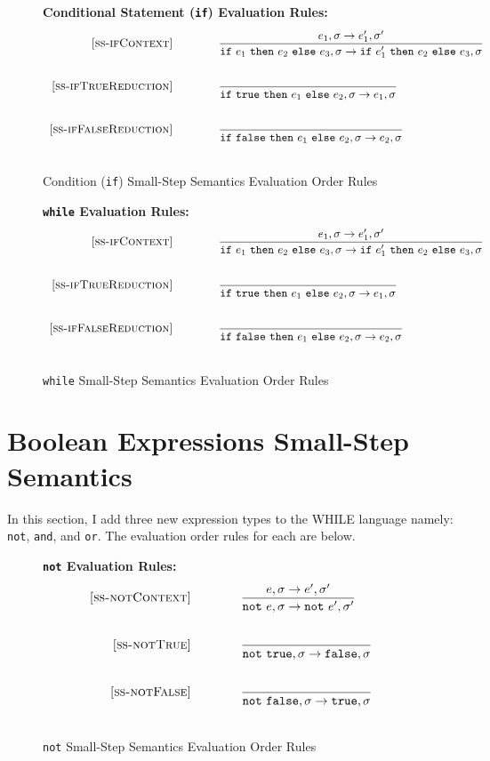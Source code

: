 \documentclass{article}
\begin{document}
\begin{figure}[H]\label{fig:condRules}
\caption{Condition ({\tt if}) Small-Step Semantics Evaluation Order Rules}
{\bf Conditional Statement ({\tt if}) Evaluation Rules:} \\
\[
\begin{array}{r@{\qquad\qquad}l}
\ssrule{ss-ifContext}{
  \sstep{e_1}{\sigma}{e_1'}{\sigma'}
}{
  \sstep{\ife{e_1}{e_2}{e_3}}{\sigma}{\ife{e_1'}{e_2}{e_3}}{\sigma}
}
\ssrule{ss-ifTrueReduction}{
}{
  \sstep{\ife{\true}{e_1}{e_2}}{\sigma}{e_1}{\sigma}
}
\ssrule{ss-ifFalseReduction}{
}{
  \sstep{\ife{\false}{e_1}{e_2}}{\sigma}{e_2}{\sigma}
}
\end{array}
\]
\end{figure}

\begin{figure}[H]\label{fig:whileRules}
\caption{{\tt while} Small-Step Semantics Evaluation Order Rules}
{\bf {\tt while} Evaluation Rules:} \\
\[
\begin{array}{r@{\qquad\qquad}l}
\ssrule{ss-ifContext}{
  \sstep{e_1}{\sigma}{e_1'}{\sigma'}
}{
  \sstep{\ife{e_1}{e_2}{e_3}}{\sigma}{\ife{e_1'}{e_2}{e_3}}{\sigma}
}
\ssrule{ss-ifTrueReduction}{
}{
  \sstep{\ife{\true}{e_1}{e_2}}{\sigma}{e_1}{\sigma}
}
\ssrule{ss-ifFalseReduction}{
}{
  \sstep{\ife{\false}{e_1}{e_2}}{\sigma}{e_2}{\sigma}
}
\end{array}
\]
\end{figure}

\section{Boolean Expressions Small-Step Semantics}

In this section, I add three new expression types to the WHILE language namely: {\tt not}, {\tt and}, and {\tt or}.  The evaluation order rules for each are below.

\begin{figure}[H]\label{fig:notRules}
\caption{{\tt not} Small-Step Semantics Evaluation Order Rules}
{\bf {\tt not} Evaluation Rules:} \\
\[
\begin{array}{r@{\qquad\qquad}l}
\ssrule{ss-notContext}{
  \sstep{e}{\sigma}{e'}{\sigma'}
}{
  \sstep{\note{e}}{\sigma}{\note{e'}}{\sigma'}
}
\ssrule{ss-notTrue}{
}{
  \sstep{\note{\true}}{\sigma}{\false}{\sigma}
}
\ssrule{ss-notFalse}{
}{
  \sstep{\note{\false}}{\sigma}{\true}{\sigma}
}
\end{array}
\]
\end{figure}
\end{document}
